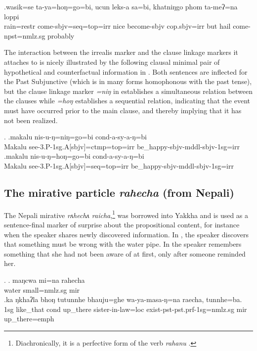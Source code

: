 \exg.wasik=se ta-ya=hoŋ=go=bi, ucun leks-a sa=bi, khatniŋgo phom ta-meʔ=na loppi\\
 rain{\sc =restr} come{\sc [3sg]-sbjv=seq=top=irr} nice become{\sc [3sg]-sbjv} {\sc cop.sbjv=irr} but hail come{\sc [3sg]-npst=nmlz.sg} probably\\


The interaction between the irrealis marker and the clause linkage markers it attaches to is nicely illustrated by the following clausal minimal pair of hypothetical and counterfactual information in \Next. Both sentences are inflected for the Past Subjunctive (which is in many forms homophonous with the past tense), but the clause linkage marker \emph{=niŋ} in \Next[a] establishes a simultaneous relation between the clauses while  \emph{=hoŋ} \Next[b] establishes a sequential relation, indicating that the event must have occurred prior to the main clause, and thereby implying that it has  not been realized. 

\ex. \ag.makalu nis-u-ŋ=niŋ=go=bi cond-a-sy-a-ŋ=bi\\
Makalu see{\sc -3.P-1sg.A[sbjv]=ctmp=top=irr} be\_happy{\sc -sbjv-mddl-sbjv-1sg=irr}\\
\bg.makalu nis-u-ŋ=hoŋ=go=bi cond-a-sy-a-ŋ=bi \\
Makalu see{\sc -3.P-1sg.A[sbjv]=seq=top=irr} be\_happy{\sc -sbjv-mddl-sbjv-1sg=irr}\\


\subsection{The mirative particle \emph{rahecha} (from Nepali)}   
 
 The Nepali mirative \emph{rʌhechʌ \ti raicha},\footnote{Diachronically, it is a perfective form of the verb \emph{rahanu} .}  was borrowed into Yakkha and is used as a sentence-final marker of surprise about the propositional content, for instance when the speaker shares newly discovered information. In \Next[a], the speaker discovers that something must be wrong with the water pipe. In \Next[b] the speaker remembers something that she had not been aware of at first, only after someone reminded her.
 
 \ex. \ag. maŋcwa mi=na  rahecha\\
 water small{\sc =nmlz.sg} {\sc mir}\\
 \bg.ka  ŋkhaʔla bhoŋ tutunnhe  bhauju=ghe    wa-ya-masa-ŋ=na    raecha, tunnhe=ba.\\
 {\sc 1sg} like\_that {\sc cond} up\_there sister-in-law{\sc =loc} exist{\sc -pst-pst.prf-1sg=nmlz.sg} {\sc mir} up\_there{\sc =emph}\\
  
 
